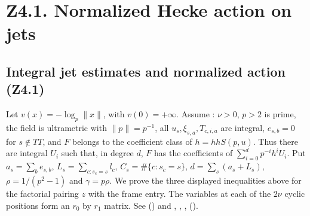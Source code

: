 \section*{Z4.1. Normalized Hecke action on jets}

\subsection{Integral jet estimates and normalized action (Z4.1)}\label{sec:P-r4-z41}
Let $v(x)=-\log_p\|x\|$, with $v(0)=+\infty$. Assume
: $\nu>0$, $p>2$ is prime, the field is ultrametric with
$\|p\|=p^{-1}$, all $u_s,\xi_{s,a},T_{c,i,a}$ are integral,
$e_{s,b}=0$ for $s\notin TT$, and $F$ belongs to the coefficient class
of $h=hhS(p,u)$. Thus there are integral $U_i$ such that, in degree
$d$, $F$ has the coefficients of $\sum_{i=0}^{d}p^{-i}h^iU_i$.
Put $a_s=\sum_b e_{s,b}$, $L_s=\sum_{c:s_c=s}l_c$,
$C_s=\#\{c:s_c=s\}$, $d=\sum_s(a_s+L_s)$, $\rho=1/(p^2-1)$ and
$\gamma=p\rho$. We prove the three displayed inequalities above
for the factorial pairing $z$ with the frame entry. The variables
at each of the $2\nu$ cyclic positions form an $r_0$ by $r_1$ matrix.
See  () and
, , , 
().

